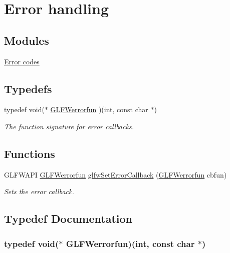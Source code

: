 \hypertarget{group__error}{\section{\-Error handling}
\label{group__error}
}
\subsection*{\-Modules}
\begin{DoxyCompactItemize}
\item 
\hyperlink{group__errors}{\-Error codes}
\end{DoxyCompactItemize}
\subsection*{\-Typedefs}
\begin{DoxyCompactItemize}
\item 
typedef void($\ast$ \hyperlink{group__error_ga6f2c8574259246a83b1d0c3baf23046f}{\-G\-L\-F\-Werrorfun} )(int, const char $\ast$)
\begin{DoxyCompactList}\small\item\em \-The function signature for error callbacks. \end{DoxyCompactList}\end{DoxyCompactItemize}
\subsection*{\-Functions}
\begin{DoxyCompactItemize}
\item 
\-G\-L\-F\-W\-A\-P\-I \hyperlink{group__error_ga6f2c8574259246a83b1d0c3baf23046f}{\-G\-L\-F\-Werrorfun} \hyperlink{group__error_ga5919096b958c47102126061fb5a6f9c3}{glfw\-Set\-Error\-Callback} (\hyperlink{group__error_ga6f2c8574259246a83b1d0c3baf23046f}{\-G\-L\-F\-Werrorfun} cbfun)
\begin{DoxyCompactList}\small\item\em \-Sets the error callback. \end{DoxyCompactList}\end{DoxyCompactItemize}


\subsection{\-Typedef \-Documentation}
\hypertarget{group__error_ga6f2c8574259246a83b1d0c3baf23046f}{
\subsubsection[{\-G\-L\-F\-Werrorfun}]{\setlength{\rightskip}{0pt plus 5cm}typedef void($\ast$  {\bf \-G\-L\-F\-Werrorfun})(int, const char $\ast$)}}\label{group__error_ga6f2c8574259246a83b1d0c3baf23046f}


